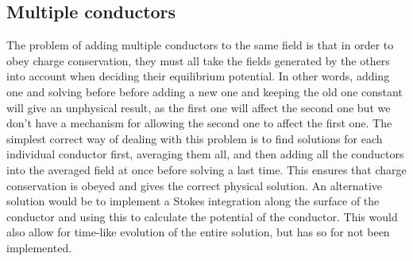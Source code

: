 \documentclass[aps,twocolumn,pre,nofootinbib,10pt]{revtex4-1}
\begin{document}
\subsection{Multiple conductors}
The problem of adding multiple conductors to the same field is that in order to obey charge conservation, they must all take the fields generated by the others into account when deciding their equilibrium potential. In other words, adding one and solving before before adding a new one and keeping the old one constant will give an unphysical result, as the first one will affect the second one but we don't have a mechanism for allowing the second one to affect the first one. The simplest correct way of dealing with this problem is to find solutions for each individual conductor first, averaging them all, and then adding all the conductors into the averaged field at once before solving a last time. This ensures that charge conservation is obeyed and gives the correct physical solution. An alternative solution would be to implement a Stokes integration along the surface of the conductor and using this to calculate the potential of the conductor. This would also allow for time-like evolution of the entire solution, but has so for not been implemented.
\end{document}
